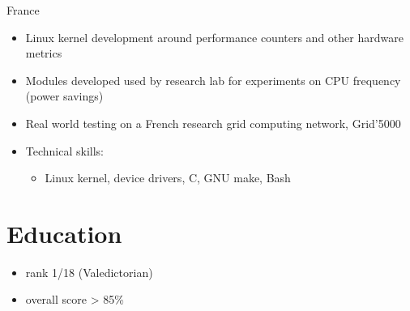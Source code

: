 \documentclass[a4paper,10pt,sans]{moderncv}
\begin{document}
{}{France}
{
  \begin{itemize}
    \item Linux kernel development around performance counters and other hardware metrics
    \item Modules developed used by research lab for experiments on CPU frequency (power savings)
    \item Real world testing on a French research grid computing network, Grid'5000
    \item Technical skills:
      \begin{itemize}
        \item Linux kernel, device drivers, C, GNU make, Bash
      \end{itemize}
  \end{itemize}
}


\section{Education}
{
  \begin{itemize}
  \item rank 1/18 (Valedictorian)
  \item overall score > 85\%
  \end{itemize}
}
\end{document}
